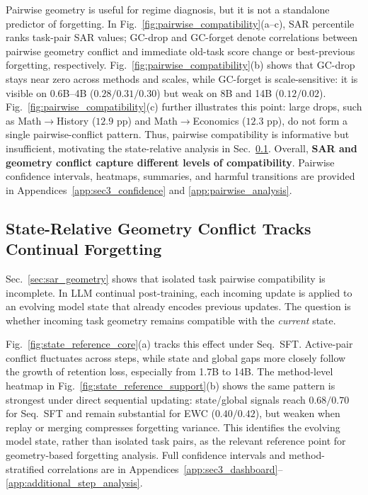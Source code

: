 \documentclass{article}
\begin{document}
Pairwise geometry is useful for regime diagnosis, but it is not a standalone predictor of forgetting.
In Fig.~\ref{fig:pairwise_compatibility}(a--c), SAR percentile ranks task-pair SAR values; GC-drop and GC-forget denote correlations between pairwise geometry conflict and immediate old-task score change or best-previous forgetting, respectively.
Fig.~\ref{fig:pairwise_compatibility}(b) shows that GC-drop stays near zero across methods and scales, while GC-forget is scale-sensitive: it is visible on 0.6B--4B (\(0.28/0.31/0.30\)) but weak on 8B and 14B (\(0.12/0.02\)).
Fig.~\ref{fig:pairwise_compatibility}(c) further illustrates this point: large drops, such as Math\(\rightarrow\)History (\(12.9\) pp) and Math\(\rightarrow\)Economics (\(12.3\) pp), do not form a single pairwise-conflict pattern.
Thus, pairwise compatibility is informative but insufficient, motivating the state-relative analysis in Sec.~\ref{sec:state_relative_geometry}.
Overall, \textbf{SAR and geometry conflict capture different levels of compatibility}. Pairwise confidence intervals, heatmaps, summaries, and harmful transitions are provided in Appendices~\ref{app:sec3_confidence} and \ref{app:pairwise_analysis}.



\vspace{-0.6em}
\subsection{State-Relative Geometry Conflict Tracks Continual Forgetting}
\label{sec:state_relative_geometry}
\vspace{-0.2em}

Sec.~\ref{sec:sar_geometry} shows that isolated task pairwise compatibility is incomplete.
In LLM continual post-training, each incoming update is applied to an evolving model state that already encodes previous updates.
The question is whether incoming task geometry remains compatible with the \emph{current} state.

Fig.~\ref{fig:state_reference_core}(a) tracks this effect under Seq.\ SFT.
Active-pair conflict fluctuates across steps, while state and global gaps more closely follow the growth of retention loss, especially from 1.7B to 14B.
The method-level heatmap in Fig.~\ref{fig:state_reference_support}(b) shows the same pattern is strongest under direct sequential updating: state/global signals reach \(0.68/0.70\) for Seq.\ SFT and remain substantial for EWC (\(0.40/0.42\)), but weaken when replay or merging compresses forgetting variance.
This identifies the evolving model state, rather than isolated task pairs, as the relevant reference point for geometry-based forgetting analysis. Full confidence intervals and method-stratified correlations are in Appendices~\ref{app:sec3_dashboard}--\ref{app:additional_step_analysis}.
\end{document}
